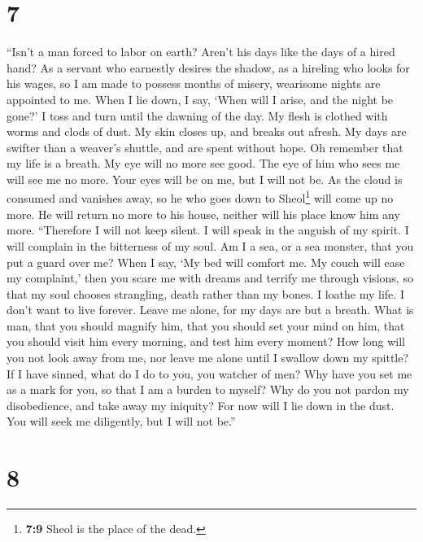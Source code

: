 \hypertarget{section-6}{%
\section{7}\label{section-6}}

 ``Isn't a man forced to labor on earth? Aren't his days
like the days of a hired hand?  As a servant who earnestly
desires the shadow, as a hireling who looks for his wages,
 so I am made to possess months of misery, wearisome
nights are appointed to me.  When I lie down, I say, `When
will I arise, and the night be gone?' I toss and turn until the dawning
of the day.  My flesh is clothed with worms and clods of
dust. My skin closes up, and breaks out afresh.  My days
are swifter than a weaver's shuttle, and are spent without hope.
 Oh remember that my life is a breath. My eye will no more
see good.  The eye of him who sees me will see me no more.
Your eyes will be on me, but I will not be.  As the cloud
is consumed and vanishes away, so he who goes down to Sheol\footnote{\textbf{7:9}
  Sheol is the place of the dead.} will come up no more. 
He will return no more to his house, neither will his place know him any
more.  ``Therefore I will not keep silent. I will speak
in the anguish of my spirit. I will complain in the bitterness of my
soul.  Am I a sea, or a sea monster, that you put a guard
over me?  When I say, `My bed will comfort me. My couch
will ease my complaint,'  then you scare me with dreams
and terrify me through visions,  so that my soul chooses
strangling, death rather than my bones.  I loathe my
life. I don't want to live forever. Leave me alone, for my days are but
a breath.  What is man, that you should magnify him, that
you should set your mind on him,  that you should visit
him every morning, and test him every moment?  How long
will you not look away from me, nor leave me alone until I swallow down
my spittle?  If I have sinned, what do I do to you, you
watcher of men? Why have you set me as a mark for you, so that I am a
burden to myself?  Why do you not pardon my disobedience,
and take away my iniquity? For now will I lie down in the dust. You will
seek me diligently, but I will not be.''

\hypertarget{section-7}{%
\section{8}\label{section-7}}

